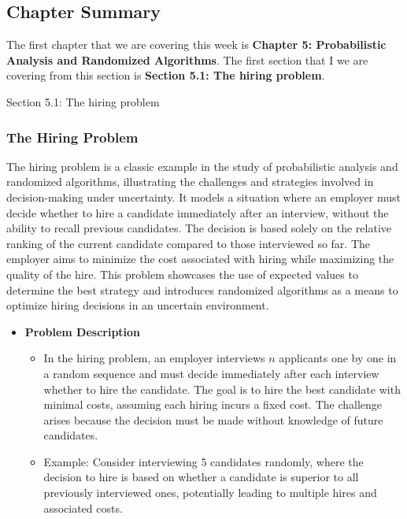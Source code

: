 \subsection{Chapter Summary}

The first chapter that we are covering this week is \textbf{Chapter 5: Probabilistic Analysis and Randomized Algorithms}. The first section that I we are covering from this section is \textbf{Section 5.1: The hiring problem}.

\begin{notes}{Section 5.1: The hiring problem}
    \subsubsection*{The Hiring Problem}

    The hiring problem is a classic example in the study of probabilistic analysis and randomized algorithms, illustrating the challenges and strategies involved in decision-making under uncertainty. 
    It models a situation where an employer must decide whether to hire a candidate immediately after an interview, without the ability to recall previous candidates. The decision is based solely on 
    the relative ranking of the current candidate compared to those interviewed so far. The employer aims to minimize the cost associated with hiring while maximizing the quality of the hire. This 
    problem showcases the use of expected values to determine the best strategy and introduces randomized algorithms as a means to optimize hiring decisions in an uncertain environment.
    
    \begin{itemize}
        \item \textbf{Problem Description}
        \begin{itemize}
            \item In the hiring problem, an employer interviews $n$ applicants one by one in a random sequence and must decide immediately after each interview whether to hire the candidate. The 
            goal is to hire the best candidate with minimal costs, assuming each hiring incurs a fixed cost. The challenge arises because the decision must be made without knowledge of future candidates.
            \item Example: Consider interviewing 5 candidates randomly, where the decision to hire is based on whether a candidate is superior to all previously interviewed ones, potentially 
            leading to multiple hires and associated costs.
        \end{itemize}
        

\end{itemize}
\end{notes}
